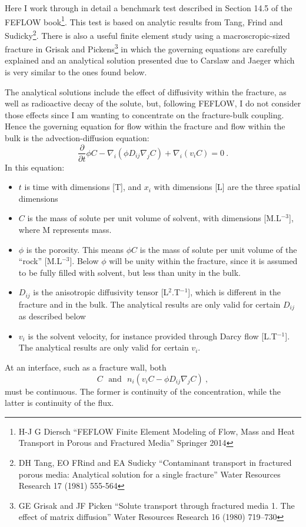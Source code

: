 \documentclass[]{scrreprt}
\begin{document}
Here I work through in detail a benchmark test described in Section
14.5 of the FEFLOW book\footnote{H-J G Diersch ``FEFLOW Finite Element
  Modeling of Flow, Mass and Heat Transport in Porous and Fractured
  Media'' Springer 2014}.  This test is based on analytic results from
Tang, Frind and Sudicky\footnote{DH Tang, EO FRind and EA Sudicky
  ``Contaminant transport in fractured porous media: Analytical
  solution for a single fracture'' Water Resources Research 17 (1981)
  555-564}.  There is also a useful finite element study using a
macroscropic-sized fracture in Grisak and Pickens\footnote{GE Grisak
  and JF Picken ``Solute transport through fractured media 1.  The
  effect of matrix diffusion'' Water Resources Research 16 (1980)
  719--730} in which the governing equations are carefully explained
and an analytical solution presented due to Carslaw and Jaeger which
is very similar to the ones found below.

The analytical solutions include the effect of diffusivity within the
fracture, as well as radioactive decay of the solute, but, following
FEFLOW, I do not consider those effects since I am wanting to
concentrate on the fracture-bulk coupling.  Hence the governing
equation for flow within the fracture and flow within the bulk is the
advection-diffusion equation:
\begin{equation}
\frac{\partial}{\partial t} \phi C - \nabla_{i}\left(\phi D_{ij}\nabla_{j}C\right)
+ \nabla_{i}\left(v_{i}C\right) = 0 \ .
\label{eqn.solute.de}
\end{equation}
In this equation:
\begin{itemize}
\item $t$ is time with dimensions [T], and $x_{i}$ with dimensions
  [L] are the three spatial dimensions
\item $C$ is the mass of solute per unit volume of solvent, with
  dimensions [M.L$^{-3}$], where M represents mass.
\item $\phi$ is the porosity.  This means $\phi C$ is the mass of
  solute per unit volume of the ``rock'' [M.L$^{-3}$].  Below $\phi$ will
  be unity within the fracture, since it is assumed to be fully filled
  with solvent, but less than unity in the bulk.
\item $D_{ij}$ is the anisotropic diffusivity tensor
  [L$^{2}$.T$^{-1}$], which is different in the fracture and in the bulk.  The analytical
  results are only valid for certain $D_{ij}$ as described below
\item $v_{i}$ is the solvent velocity, for instance provided through
  Darcy flow [L.T$^{-1}$].  The analytical results are only valid for certain
  $v_{i}$.
\end{itemize}
At an interface, such as a fracture wall, both
\begin{equation}
C \ \ \ \mbox{and}\ \ \ n_{i}(v_{i}C - \phi D_{ij}\nabla_{j}C) \ ,
\end{equation}
must be continuous.  The former is continuity of the concentration,
while the latter is continuity of the flux.
\end{document}
